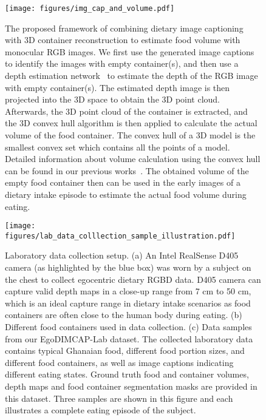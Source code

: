 \documentclass[journal]{IEEEtran}
\begin{document}
\begin{figure*}[!t]
\centerline{\texttt{[image: figures/img\_cap\_and\_volume.pdf]}}
\caption{The proposed framework of combining dietary image captioning with 3D container reconstruction to estimate food volume with monocular RGB images. We first use the generated image captions to identify the images with empty container(s), and then use a depth estimation network~\cite{alhashim2018high} to estimate the depth of the RGB image with empty container(s). The estimated depth image is then projected into the 3D space to obtain the 3D point cloud. Afterwards, the 3D point cloud of the container is extracted, and the 3D convex hull algorithm is then applied to calculate the actual volume of the food container. The convex hull of a 3D model is the smallest convex set which contains all the points of a model. Detailed information about volume calculation using the convex hull can be found in our previous works~\cite{lo2018food, lo2019point2volume}. The obtained volume of the empty food container then can be used in the early images of a dietary intake episode to estimate the actual food volume during eating.}
\label{fig:img_cap_and_volume}
\end{figure*}





\begin{figure}[!t]
\centerline{\texttt{[image: figures/lab\_data\_colllection\_sample\_illustration.pdf]}}
\caption{Laboratory data collection setup. (a) An Intel RealSense D405 camera (as highlighted by the blue box) was worn by a subject on the chest to collect egocentric dietary RGBD data. D405 camera can capture valid depth maps in a close-up range from 7 cm to 50 cm, which is an ideal capture range in dietary intake scenarios as food containers are often close to the human body during eating. (b) Different food containers used in data collection. (c) Data samples from our EgoDIMCAP-Lab dataset. The collected laboratory data contains typical Ghanaian food, different food portion sizes, and different food containers, as well as image captions indicating different eating states. Ground truth food and container volumes, depth maps and food container segmentation masks are provided in this dataset. Three samples are shown in this figure and each illustrates a complete eating episode of the subject.}
\label{fig:lab_data_collection_sample_illustration}

\end{figure}
\end{document}
